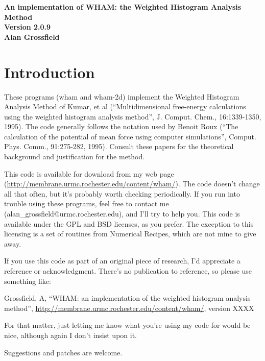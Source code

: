 \documentclass[12pt]{article}
\begin{document}
\begin{center}
\begin{LARGE}
{\bf An implementation of WHAM: the Weighted Histogram Analysis Method} \\
{\bf Version 2.0.9} \\
\vspace*{0.5in}
{\bf Alan Grossfield} \\
\end{LARGE}
\end{center}

\tableofcontents

\newpage

\section{Introduction}

These programs (wham and wham-2d) implement the Weighted Histogram
Analysis Method of Kumar, et al (``Multidimensional free-energy
calculations using the weighted histogram analysis method'',
J. Comput. Chem., 16:1339-1350, 1995).  The code generally
follows the notation used by Benoit Roux (``The calculation of the
potential of mean force using computer simulations'', Comput. Phys. Comm.,
91:275-282, 1995).  Consult these papers for the theoretical background
and justification for the method.

This code is available for download from my web page
(\url{http://membrane.urmc.rochester.edu/content/wham/}). The code doesn't
change all that often, but it's probably worth checking periodically.  If you
run into trouble using these programs, feel free to contact me
(alan\_grossfield@urmc.rochester.edu), and I'll try to help you.  This code
is available under the GPL and BSD licenses, as you prefer.  The exception to
this licensing is a set of routines from Numerical Recipes, which are not mine
to give away.  

If you use this code as part of an original piece of research, I'd
appreciate a reference or acknowledgment.  There's no publication to
reference, so please use something like:

\noindent
Grossfield, A, ``WHAM: an implementation of the weighted histogram analysis 
method'', \url{http://membrane.urmc.rochester.edu/content/wham/}, version
XXXX

\noindent For that matter, just letting me know what you're using my code for
would be nice, although again I don't insist upon it.

Suggestions and patches are welcome.  
\end{document}
